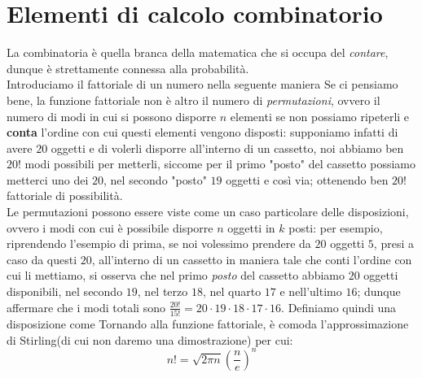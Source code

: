 \documentclass{report}
\begin{document}
	\section{Elementi di calcolo combinatorio}
	La combinatoria è quella branca della matematica che si occupa del \emph{contare}, dunque è strettamente connessa alla probabilità. \\
	Introduciamo il fattoriale di un numero nella seguente maniera
\noindent Se ci pensiamo bene, la funzione fattoriale non è altro il numero di \emph{permutazioni}, ovvero il numero di modi in cui si possono disporre $n$ elementi se non possiamo ripeterli e \textbf{conta} l'ordine con cui questi elementi vengono disposti: supponiamo infatti di avere $20$ oggetti e di volerli disporre all'interno di un cassetto, noi abbiamo ben $20!$ modi possibili per metterli, siccome per il primo "posto" del cassetto possiamo metterci uno dei $20$, nel secondo "posto" $19$ oggetti e così via; ottenendo ben $20!$ fattoriale di possibilità. \\
	Le permutazioni possono essere viste come un caso particolare delle disposizioni, ovvero i modi con cui è possibile disporre $n$ oggetti in $k$ posti: per esempio, riprendendo l'esempio di prima, se noi volessimo prendere da $20$ oggetti $5$, presi a caso da questi $20$, all'interno di un cassetto in maniera tale che conti l'ordine con cui li mettiamo, si osserva che nel primo \emph{posto} del cassetto abbiamo $20$ oggetti disponibili, nel secondo $19$, nel terzo $18$, nel quarto $17$ e nell'ultimo $16$; dunque affermare che i modi totali sono $\frac{20!}{15!} = 20 \cdot 19 \cdot 18 \cdot 17 \cdot 16$. Definiamo quindi una disposizione come
\noindent Tornando alla funzione fattoriale, è comoda l'approssimazione di Stirling\ignorespaces (di cui non daremo una dimostrazione) per cui:
\begin{equation}
	n! = \sqrt{2\pi n} \left( \frac{n}{e} \right)^n
\end{equation}
\end{document}
